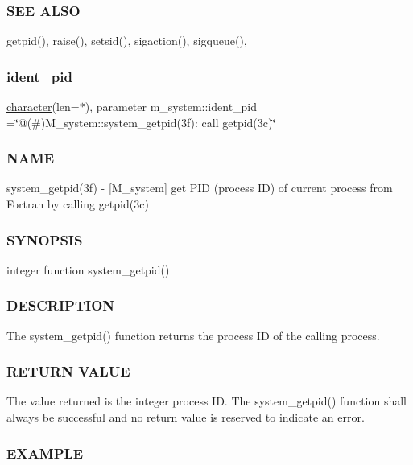 \subsubsection*{S\+EE A\+L\+SO}

getpid(), raise(), setsid(), sigaction(), sigqueue(), \mbox{\label{namespacem__system_a6f5d3dc2ba4ac439e0ba6b428918f956}} 
\subsubsection{\texorpdfstring{ident\+\_\+pid}{ident\_pid}}
{\footnotesize\ttfamily \hyperlink{option__stopwatch_83_8txt_abd4b21fbbd175834027b5224bfe97e66}{character}(len=$\ast$), parameter m\+\_\+system\+::ident\+\_\+pid =\char`\"{}@(\#)M\+\_\+system\+::system\+\_\+getpid(3f)\+: call getpid(3c)\char`\"{}\hspace{0.3cm}{\ttfamily [private]}}



\subsubsection*{N\+A\+ME}

system\+\_\+getpid(3f) -\/ \mbox{[}M\+\_\+system\mbox{]} get P\+ID (process ID) of current process from Fortran by calling getpid(3c) \subsubsection*{S\+Y\+N\+O\+P\+S\+IS}

integer function system\+\_\+getpid() \subsubsection*{D\+E\+S\+C\+R\+I\+P\+T\+I\+ON}

The system\+\_\+getpid() function returns the process ID of the calling process. \subsubsection*{R\+E\+T\+U\+RN V\+A\+L\+UE}

The value returned is the integer process ID. The system\+\_\+getpid() function shall always be successful and no return value is reserved to indicate an error. \subsubsection*{E\+X\+A\+M\+P\+LE}

